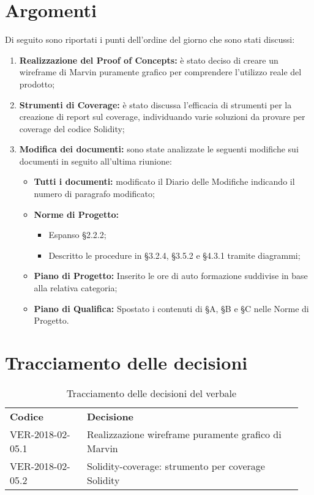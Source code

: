 \documentclass[VER-2018-05-02.tex]{subfiles}
\begin{document}
\section{Argomenti}
Di seguito sono riportati i punti dell'ordine del giorno che sono stati discussi:
\begin{enumerate}
	\item \textbf{Realizzazione del Proof of Concepts:} è stato deciso di creare un wireframe di Marvin puramente grafico per comprendere l'utilizzo reale del prodotto;
	\item \textbf{Strumenti di Coverage:} è stato discussa l'efficacia di strumenti per la creazione di report sul coverage, individuando varie soluzioni da provare per coverage del codice Solidity;	
	\item \textbf{Modifica dei documenti:} sono state analizzate le seguenti modifiche sui documenti in seguito all'ultima riunione:
	\begin{itemize}
		\item \textbf{Tutti i documenti:} modificato il Diario delle Modifiche indicando il numero di paragrafo modificato;
		\item \textbf{Norme di Progetto:} \begin{itemize}
										     \item Espanso \S 2.2.2;
										     \item Descritto le procedure in \S 3.2.4, \S 3.5.2 e \S 4.3.1 tramite diagrammi;
								           \end{itemize}
      \item \textbf{Piano di Progetto:} Inserito le ore di auto formazione suddivise in base alla relativa categoria;
      \item\textbf{Piano di Qualifica:} Spostato i contenuti di \S A, \S B e \S C nelle Norme di Progetto.
	\end{itemize}
\end{enumerate}

\section{Tracciamento delle decisioni}
\begin{table}[H]
	\begin{center}
		\begin{tabu} to 
			\tableHeaderStyle
			\textbf{Codice} & \textbf{Decisione} \\
			VER-2018-02-05.1 & Realizzazione wireframe puramente grafico di Marvin \\
			VER-2018-02-05.2 & Solidity-coverage: strumento per coverage Solidity \\
		\end{tabu}
		\caption{Tracciamento delle decisioni del verbale}
	\end{center}
\end{table}
\end{document}
